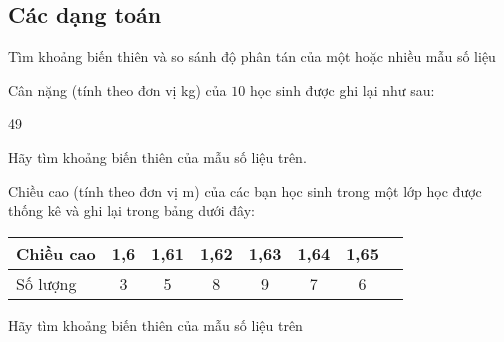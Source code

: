 \subsection{Các dạng toán}
\begin{dang}{Tìm khoảng biến thiên và so sánh độ phân tán của một hoặc nhiều mẫu số liệu}
\end{dang}
\viduminhhoa	
\begin{vd}%
	Cân nặng (tính theo đơn vị kg) của $10$ học sinh được ghi lại như sau:
	\begin{center}
		49         
	\end{center}
	Hãy tìm khoảng biến thiên của mẫu số liệu trên.
\end{vd}

\begin{vd}%
	Chiều cao (tính theo đơn vị m) của các bạn học sinh trong một lớp học được thống kê và ghi lại trong bảng dưới đây:
	\begin{longtable}{|l|c|c|c|c|c|c|c|}
		\hline
		Chiều cao & 1{,}6 & 1{,}61 & 1{,}62 & 1{,}63 & 1{,}64 & 1{,}65\\
		\hline
		Số lượng & 3 & 5 & 8 & 9 & 7 & 6\\
		\hline
	\end{longtable}
	Hãy tìm khoảng biến thiên của mẫu số liệu trên
\end{vd}

